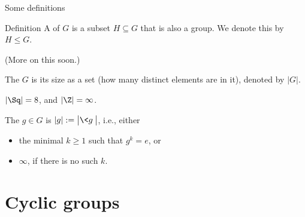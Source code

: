 \documentclass[8pt, handout]{beamer}
\newcommand{\Pause}{}      %
\begin{document}

\begin{frame}{Some definitions} %

  \begin{block}{Definition}
    A  of $G$ is a subset $H\subseteq G$ that
    is also a group. We denote this by $H\leq G$.
  \end{block}

  (More on this soon.)

  \bigskip\Pause
  
  \begin{definition}
    The  $G$ is its size as a set 
    (how many distinct elements are in it), denoted by
    $|G|$.
  \end{definition} \Pause

  \begin{example}
    $|\Sq| = 8$, and $|\Z| = \infty$.
  \end{example}

  \bigskip\Pause
  
  \begin{definition}
    The  $g\in G$ is
    $|g|:=\big|\<g\>\big|$, i.e., either \smallskip
    \begin{itemize}
    \item the minimal $k\geq 1$ such that $g^k=e$, or \smallskip
    \item $\infty$, if there is no such $k$.
    \end{itemize}
  \end{definition}
  
\end{frame}

\section{Cyclic groups}


\end{document}
